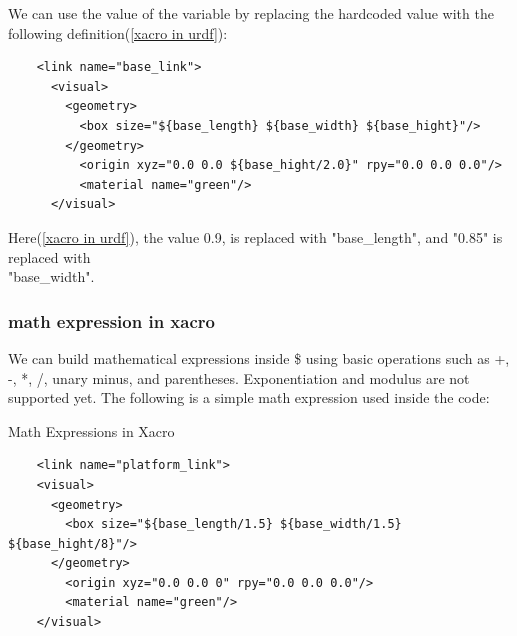 \documentclass[../../main]{subfiles}
\begin{document}
We can use the value of the variable by replacing the hardcoded value with the following
definition(\cref{xacro in urdf}):
\begin{codebox}[label=xacro in urdf]{}
  \begin{verbatim}
    <link name="base_link">
      <visual>
        <geometry>
          <box size="${base_length} ${base_width} ${base_hight}"/>
        </geometry>
          <origin xyz="0.0 0.0 ${base_hight/2.0}" rpy="0.0 0.0 0.0"/>
          <material name="green"/>
      </visual>
\end{verbatim}
  \end{codebox}

Here(\cref{xacro in urdf}), the value 0.9, is replaced with "{base\_length}", and "0.85" is
replaced with \\"{base\_width}".

\subsubsection{math expression in xacro}
We can build mathematical expressions inside \${} using basic operations such as +, -, *,
/, unary minus, and parentheses. Exponentiation and modulus are not supported yet. The
following is a simple math expression used inside the code:
\begin{codebox}[]{Math Expressions in Xacro}
  \begin{verbatim}
    <link name="platform_link">
    <visual>
      <geometry>
        <box size="${base_length/1.5} ${base_width/1.5} ${base_hight/8}"/>
      </geometry>
        <origin xyz="0.0 0.0 0" rpy="0.0 0.0 0.0"/>
        <material name="green"/>
    </visual>
\end{verbatim}
\end{codebox}
\end{document}
